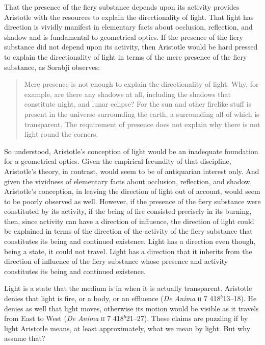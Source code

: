 That the presence of the fiery substance depends upon its activity provides Aristotle with the resources to explain the directionality of light. That light has direction is vividly manifest in elementary facts about occlusion, reflection, and shadow and is fundamental to geometrical optics. If the presence of the fiery substance did not depend upon its activity, then Aristotle would be hard pressed to explain the directionality of light in terms of the mere presence of the fiery substance, as Sorabji observes: 
\begin{quote}
	Mere presence is not enough to explain the directionality of light. Why, for example, are there any shadows at all, including the shadows that constitute night, and lunar eclipse? For the sun and other firelike stuff is present in the universe surrounding the earth, a surrounding all of which is transparent. The requirement of presence does not explain why there is not light round the corners. \citep[132]{Sorabji:2004fk}
\end{quote}
So understood, Aristotle's conception of light would be an inadequate foundation for a geometrical optics. Given the empirical fecundity of that discipline, Aristotle's theory, in contrast, would seem to be of antiquarian interest only. And given the vividness of elementary facts about occlusion, reflection, and shadow, Aristotle's conception, in leaving the direction of light out of account, would seem to be poorly observed as well. However, if the presence of the fiery substance were constituted by its activity, if the being of fire consisted precisely in its burning, then, since activity can have a direction of influence, the direction of light could be explained in terms of the direction of the activity of the fiery substance that constitutes its being and continued existence. Light has a direction even though, being a state, it could not travel. Light has a direction that it inherits from the direction of influence of the fiery substance whose presence and activity constitutes its being and continued existence.

Light is a state that the medium is in when it is actually transparent. Aristotle denies that light is fire, or a body, or an effluence (\emph{De Anima} \textsc{ii} 7 418\( ^{b} \)13--18). He denies as well that light moves, otherwise its motion would be visible as it travels from East to West (\emph{De Anima} \textsc{ii} 7 418\( ^{b} \)21--27). These claims are puzzling if by light Aristotle means, at least approximately, what we mean by light. But why assume that? 

